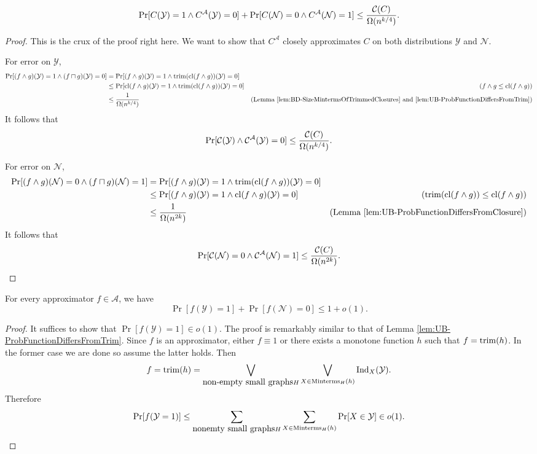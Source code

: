 \documentclass[11pt]{article}
\begin{document}
 	\begin{lemma}
 		\label{lem:UB-ApproxCircuitInequality}
 		\[\Pr[C(\mathcal{Y}) = 1 \land C^{\mathcal{A}}(\mathcal{Y}) = 0] + \Pr[C(\mathcal{N}) = 0 \land C^{\mathcal{A}}(\mathcal{N}) = 1] \leq \frac{\mathcal{C}(C)}{\Omega(n^{k/4})}.\]
 	\end{lemma}
 	\begin{proof}
 		This is the crux of the proof right here. We want to show that $C^{\mathcal{A}}$ closely approximates $C$ on both distributions $\mathcal{Y}$ and $\mathcal{N}$. 
 		
 		For error on $\mathcal{Y}$, 
 		\begin{align*}
 			\Pr[(f\land g)(\mathcal{Y}) = 1 \land (f\sqcap g)(\mathcal{Y}) = 0] &= \Pr[(f \land g)(\mathcal{Y}) = 1 \land \mathrm{trim}(\mathrm{cl}(f\land g))(\mathcal{Y}) = 0]\\
 			&\leq \Pr[\mathrm{cl}(f \land g)(\mathcal{Y}) = 1 \land \mathrm{trim}(\mathrm{cl}(f\land g))(\mathcal{Y}) = 0] &\mbox{($f\land g \leq \mathrm{cl}(f\land g))$}\\
 			&\leq \frac{1}{\Omega(n^{k/4})} &\mbox{(Lemma \ref{lem:BD-SizeMintermsOfTrimmedClosures} and  \ref{lem:UB-ProbFunctionDiffersFromTrim})}
 		\end{align*}
 		It follows that
 		\[\Pr[\mathcal{C}(\mathcal{Y}) \land \mathcal{C}^{\mathcal{A}}(\mathcal{Y}) = 0] \leq \frac{\mathcal{C}(C)}{\Omega(n^{k/4})}.\]
 		
 		For error on $\mathcal{N}$,
 		\begin{align*}
 			\Pr[(f\land g)(\mathcal{N}) = 0 \land (f\sqcap g)(\mathcal{N}) = 1] &= \Pr[(f \land g)(\mathcal{Y}) = 1 \land \mathrm{trim}(\mathrm{cl}(f\land g))(\mathcal{Y}) = 0]\\
 			&\leq \Pr[(f \land g)(\mathcal{Y}) = 1 \land \mathrm{cl}(f\land g)(\mathcal{Y}) = 0] &\mbox{($\mathrm{trim}(\mathrm{cl}(f\land g)) \leq \mathrm{cl}(f \land g)$)}\\
 			&\leq \frac{1}{\Omega(n^{2k})} &\mbox{(Lemma \ref{lem:UB-ProbFunctionDiffersFromClosure})}
 		\end{align*}
 		It follows that 
 		\[\Pr[\mathcal{C}(\mathcal{N}) = 0 \land \mathcal{C}^{\mathcal{A}}(\mathcal{N}) = 1] \leq \frac{\mathcal{C}(C)}{\Omega(n^{2k})}.\]
 	\end{proof}
 
 	\begin{lemma}
 		\label{lem:UB-FunctionValues}
 		For every approximator $f \in \mathcal{A}$, we have
 		\[\Pr[f(\mathcal{Y}) = 1] + \Pr[f(\mathcal{N}) = 0] \leq 1 + o(1).\]
 	\end{lemma}
 	\begin{proof}
 		It suffices to show that $\Pr[f(\mathcal{Y}) = 1] \in o(1)$. The proof is remarkably similar to that of Lemma \ref{lem:UB-ProbFunctionDiffersFromTrim}. Since $f$ is an approximator, either $f \equiv 1$ or there exists a monotone function $h$ such that $f = \mathrm{trim}(h)$. In the former case we are done so assume the latter holds. Then
 		\[f = \mathrm{trim}(h) = \bigvee_{\mbox{non-empty small graphs} H}\bigvee_{X \in \mathrm{Minterms}_H(h)} \mathrm{Ind}_X(\mathcal{Y}).\]
 		Therefore
 		\[\Pr[f(\mathcal{Y} = 1)] \leq \sum_{\mbox{nonemty small graphs} H}\sum_{X \in \mathrm{Minterms}_H(h)} \Pr[X\in\mathcal{Y}] \in o(1).\]
 	\end{proof}
 
\end{document}
